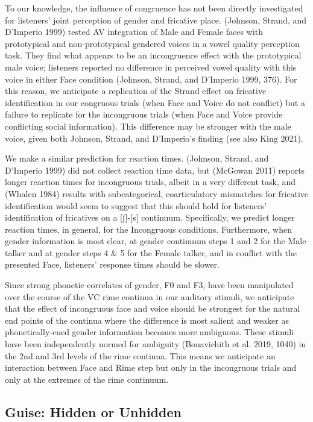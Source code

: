 \documentclass[
  letterpaper,
  DIV=11,
  numbers=noendperiod]{scrartcl}
\begin{document}
To our knowledge, the influence of congruence has not been directly
investigated for listeners' joint perception of gender and fricative
place. (Johnson, Strand, and D'Imperio 1999) tested AV integration of
Male and Female faces with prototypical and non-prototypical gendered
voices in a vowel quality perception task. They find what appears to be
an incongruence effect with the prototypical male voice; listeners
reported no difference in perceived vowel quality with this voice in
either Face condition (Johnson, Strand, and D'Imperio 1999, 376). For
this reason, we anticipate a replication of the Strand effect on
fricative identification in our congruous trials (when Face and Voice do
not conflict) but a failure to replicate for the incongruous trials
(when Face and Voice provide conflicting social information). This
difference may be stronger with the male voice, given both Johnson,
Strand, and D'Imperio's finding (see also King 2021).

We make a similar prediction for reaction times. (Johnson, Strand, and
D'Imperio 1999) did not collect reaction time data, but (McGowan 2011)
reports longer reaction times for incongruous trials, albeit in a very
different task, and (Whalen 1984) results with subcategorical,
coarticulatory mismatches for fricative identification would seem to
suggest that this should hold for listeners' identification of
fricatives on a {[}ʃ{]}-{[}s{]} continuum. Specifically, we predict
longer reaction times, in general, for the Incongruous conditions.
Furthermore, when gender information is most clear, at gender continuum
steps 1 and 2 for the Male talker and at gender steps 4 \& 5 for the
Female talker, and in conflict with the presented Face, listeners'
response times should be slower.

Since strong phonetic correlates of gender, F0 and F3, have been
manipulated over the course of the VC rime continua in our auditory
stimuli, we anticipate that the effect of incongruous face and voice
should be strongest for the natural end points of the continua where the
difference is most salient and weaker as phonetically-cued gender
information becomes more ambiguous. These stimuli have been
independently normed for ambiguity (Bouavichith et al. 2019, 1040) in
the 2nd and 3rd levels of the rime continua. This means we anticipate an
interaction between Face and Rime step but only in the incongruous
trials and only at the extremes of the rime continuum.

\subsection{Guise: Hidden or Unhidden}\label{sec-pred-guise}
\end{document}
